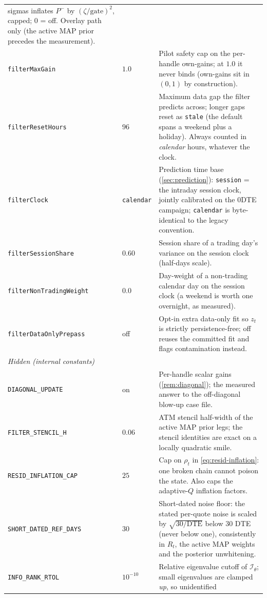 \documentclass[11pt]{article}
\newcommand{\calI}{\mathcal I}
\begin{document}
\begin{longtable}{p{}p{}p{}}
sigmas inflates $P^-$ by $(\zeta/\text{gate})^2$, capped; $0$ = off. Overlay
path only (the active MAP prior precedes the measurement).\\
\texttt{filterMaxGain} & $1.0$ & Pilot safety cap on the per-handle own-gains;
at $1.0$ it never binds (own-gains sit in $(0,1)$ by construction).\\
\texttt{filterResetHours} & $96$ & Maximum data gap the filter predicts
across; longer gaps reset as \texttt{stale} (the default spans a weekend plus
a holiday). Always counted in \emph{calendar} hours, whatever the clock.\\
\texttt{filterClock} & \texttt{calendar} & Prediction time base
(\cref{sec:prediction}): \texttt{session} = the intraday session clock,
jointly calibrated on the 0DTE campaign; \texttt{calendar} is byte-identical
to the legacy convention.\\
\texttt{filterSessionShare} & $0.60$ & Session share of a trading day's
variance on the session clock (half-days scale).\\
\texttt{filterNonTradingWeight} & $0.0$ & Day-weight of a non-trading
calendar day on the session clock (a weekend is worth one overnight, as
measured).\\
\texttt{filterDataOnlyPrepass} & off & Opt-in extra data-only fit so $z_t$ is
strictly persistence-free; off reuses the committed fit and flags
contamination instead.\\
\midrule
\multicolumn{3}{l}{\emph{Hidden (internal constants)}}\\ \midrule
\texttt{DIAGONAL\_UPDATE} & on & Per-handle scalar gains
(\cref{rem:diagonal}); the measured answer to the off-diagonal blow-up case
file.\\
\texttt{FILTER\_STENCIL\_H} & $0.06$ & ATM stencil half-width of the active
MAP prior legs; the stencil identities are exact on a locally quadratic
smile.\\
\texttt{RESID\_INFLATION\_CAP} & $25$ & Cap on $\rho_t$ in
\cref{eq:resid-inflation}: one broken chain cannot poison the state. Also
caps the adaptive-$Q$ inflation factors.\\
\texttt{SHORT\_DATED\_REF\_DAYS} & $30$ & Short-dated noise floor: the stated
per-quote noise is scaled by $\sqrt{30/\mathrm{DTE}}$ below $30$ DTE (never
below one), consistently in $R_t$, the active MAP weights and the posterior
unwhitening.\\
\texttt{INFO\_RANK\_RTOL} & $10^{-10}$ & Relative eigenvalue cutoff of
$\calI_\theta$; small eigenvalues are clamped \emph{up}, so unidentified

\end{longtable}
\end{document}

